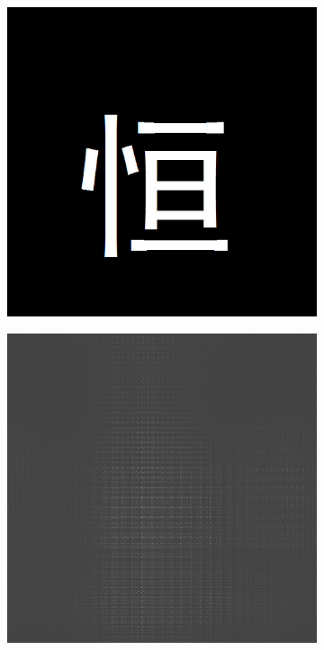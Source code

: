 \documentclass{ctexart}
\begin{document}
\begin{figure}[H]
  \centering
  \begin{subfigure}{.32\textwidth}
    \includegraphics[width=\linewidth]{数字全息实验数据/计算机模拟全息/全息样品图片/4-恒.jpg}
  \end{subfigure}
  \begin{subfigure}{.32\textwidth}
    \includegraphics[width=\linewidth]{数字全息实验数据/计算机模拟全息/用软件模拟得到的全息图/4-恒-全息图.jpg}

\end{subfigure}
\end{figure}
\end{document}
